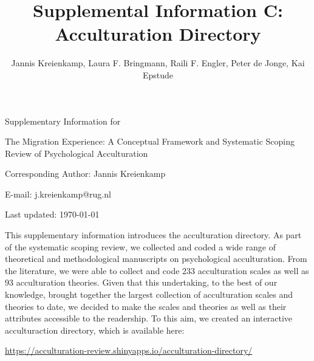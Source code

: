 \documentclass[man, 12pt, a4paper]{apa7}
\title{Supplemental Information C: Acculturation Directory}
\author{Jannis Kreienkamp, Laura F. Bringmann, Raili F. Engler, Peter de Jonge, Kai Epstude}
\begin{document}
\begin{titlepage}
	{\noindent\Large Supplementary Information for \par}
	\vspace{0.5cm}
	{\noindent\Large The Migration Experience: A Conceptual Framework and Systematic Scoping Review of Psychological Acculturation\par}
	\vspace{1.5cm}
	{\noindent\LARGE\bfseries \thetitle \par}
	\vspace{2cm}
	{\noindent\Large\itshape \theauthor \par}
	\vfill
	\noindent Corresponding Author: Jannis Kreienkamp\par
	\noindent E-mail: j.kreienkamp@rug.nl\par
	\vfill

	{\noindent Last updated: \today\par}
\end{titlepage}

\begin{center}
   \textbf{\thetitle} 
\end{center}

This supplementary information introduces the acculturation directory. As part of the systematic scoping review, we collected and coded a wide range of theoretical and methodological manuscripts on psychological acculturation. From the literature, we were able to collect and code 233 acculturation scales as well as 93 acculturation theories. Given that this undertaking, to the best of our knowledge, brought together the largest collection of acculturation scales and theories to date, we decided to make the scales and theories as well as their attributes accessible to the readership. To this aim, we created an interactive acculturaction directory, which is available here:

\vspace{.5cm}
\begin{tcolorbox}
    \vspace{0.2cm} \centering 
    \href{https://acculturation-review.shinyapps.io/acculturation-directory/}{https://acculturation-review.shinyapps.io/acculturation-directory/}
    \vspace{0.2cm} 
\end{tcolorbox}
\end{document}
